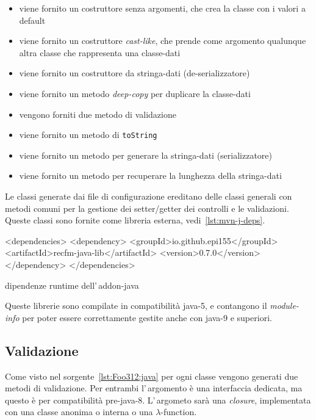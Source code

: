 \documentclass[a4paper,10pt]{report}
\newenvironment{elisting}[1][H]
  {\captionsetup{aboveskip=0pt}\begin{listing}[#1]}
  {\end{listing}%
}
\begin{document}
\begin{itemize}
\item viene fornito un costruttore senza argomenti, che crea la classe con i 
    valori a default
\item viene fornito un costruttore \textit{cast-like}, che prende come argomento
    qualunque altra classe che rappresenta una classe-dati
\item viene fornito un costruttore da stringa-dati (de-serializzatore)
\item viene fornito un metodo \textit{deep-copy} per duplicare la classe-dati
\item vengono forniti due metodo di validazione
\item viene fornito un metodo di \texttt{toString}
\item viene fornito un metodo per generare la stringa-dati (serializzatore)
\item viene fornito un metodo per recuperare la lunghezza della stringa-dati
\end{itemize}

Le classi generate dai file di configurazione ereditano delle classi generali
con metodi comuni per la gestione dei setter/getter dei controlli e le 
validazioni. Queste classi sono fornite come libreria esterna, 
vedi~\ref{lst:mvn-j-deps}.

\begin{elisting}[!htb]
\begin{xmlcode}
<dependencies>
  <dependency>
    <groupId>io.github.epi155</groupId>
    <artifactId>recfm-java-lib</artifactId>
    <version>0.7.0</version>
  </dependency>
</dependencies>
\end{xmlcode}
\caption{dipendenze runtime dell'\,addon-java}
\label{lst:mvn-j-deps}
\end{elisting}

Queste librerie sono compilate in compatibilità java-5, e contangono il
\textsl{module-info} per poter essere correttamente gestite anche con java-9 e
superiori.

\subsection{Validazione}
Come visto nel sorgente~\ref{lst:Foo312:java} per ogni classe vengono generati
due metodi di validazione. Per entrambi l'\,argo\-men\-to è una interfaccia 
dedicata, ma questo è per compatibilità pre-java-8.
L'\,argometo sarà una \textit{closure}, implementata con una classe anonima o 
interna o una $\lambda$-function.
\end{document}
